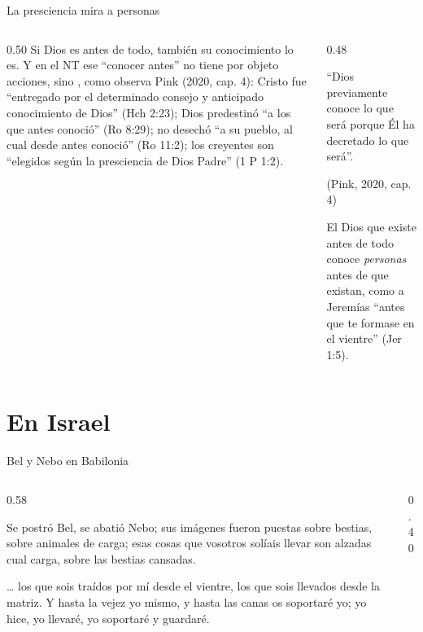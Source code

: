 \begin{frame}{La presciencia mira a personas}
\begin{columns}[t,onlytextwidth]
\begin{column}{0.50\textwidth}\small
Si Dios es antes de todo, también su conocimiento lo es. Y en el NT ese ``conocer antes'' no tiene por objeto acciones, sino , como observa Pink (2020, cap. 4): Cristo fue ``entregado por el determinado consejo y anticipado conocimiento de Dios'' (Hch 2:23); Dios predestinó ``a los que antes conoció'' (Ro 8:29); no desechó ``a su pueblo, al cual desde antes conoció'' (Ro 11:2); los creyentes son ``elegidos según la presciencia de Dios Padre'' (1 P 1:2).
\end{column}
\begin{column}{0.48\textwidth}
\begin{tcolorbox}[colback=papiro,colframe=dorado,boxrule=1pt,arc=3pt]
\centering\small ``Dios previamente conoce lo que será porque Él ha decretado lo que será''.\par{\scriptsize\color{gris}(Pink, 2020, cap. 4)}
\end{tcolorbox}
\scriptsize El Dios que existe antes de todo conoce \emph{personas} antes de que existan, como a Jeremías ``antes que te formase en el vientre'' (Jer 1:5).\par\smallskip
{}
\end{column}
\end{columns}
\end{frame}

\section{En Israel}

\begin{frame}{Bel y Nebo en Babilonia}
\begin{columns}[c,onlytextwidth]
\begin{column}{0.58\textwidth}
\begin{cita}Se postró Bel, se abatió Nebo; sus imágenes fueron puestas sobre bestias, sobre animales de carga; esas cosas que vosotros solíais llevar son alzadas cual carga, sobre las bestias cansadas.\end{cita}
\begin{cita}\ldots{} los que sois traídos por mí desde el vientre, los que sois llevados desde la matriz. Y hasta la vejez yo mismo, y hasta las canas os soportaré yo; yo hice, yo llevaré, yo soportaré y guardaré.\end{cita}
\end{column}
\begin{column}{0.40\textwidth}\end{column}
\end{columns}
\end{frame}


